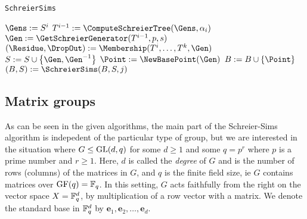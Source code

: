 \begin{algorithm} 
\dontprintsemicolon
\caption{\texttt{SchreierSims}}



\Begin
{
  $\Gens := S^i$ \;
  $T^{i - 1} := \ComputeSchreierTree(\Gens, \alpha_i)$ \; \label{alg:ss_comp_tree}
  {
    {
      $\Gen := \GetSchreierGenerator(T^{i - 1}, p, s)$ \;
      {
        $(\Residue, \DropOut) := \Membership(T^i, \dotsc, T^k, \Gen)$ \;
        {
          $S := S \cup \set{\Gen, \Gen^{-1}}$ \;
          {
            $\Point := \NewBasePoint(\Gen)$ \;
            $B := B \cup \set{\Point}$ \;
          }
          {
            $(B, S) := \SchreierSims(B, S, j)$ \;
          }
        }
      }    
    }
  }
}
\label{alg:ss}
\end{algorithm}

\subsection{Matrix groups}
As can be seen in the given algorithms, the main part of the
Schreier-Sims algorithm is indepedent of the particular type of group,
but we are interested in the situation where $G \leq \operatorname{GL}(d, q)$ for
some $d \geq 1$ and some $q = p^r$ where $p$ is a prime number and $r
\geq 1$. Here, $d$ is called the \emph{degree} of $G$ and is the
number of rows (columns) of the matrices in $G$, and $q$ is the finite
field size, ie $G$ contains matrices over $\operatorname{GF}(q) = \mathbb{F}_q$. In this
setting, $G$ acts faithfully from the right on the vector space $X = \mathbb{F}_q^d$, by multiplication of a row vector with a matrix. We denote the standard base in $\mathbb{F}_q^d$ by $\mathbf{e}_1, \mathbf{e}_2, \dotsc, \mathbf{e}_d$.

